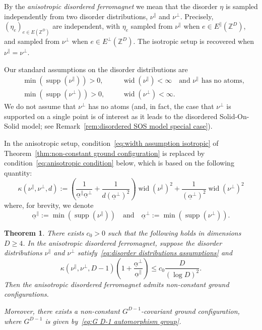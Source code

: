 \documentclass[11pt, reqno]{amsart}
\newtheorem{theorem}{Theorem}[section]
\newcommand{\Z}{\mathbb{Z}}
\DeclareMathOperator{\supp}{supp}
\DeclareMathOperator{\wid}{wid}
\numberwithin{equation}{section}
\begin{document}
By the \emph{anisotropic disordered ferromagnet} we mean that the disorder $\eta$ is sampled independently from two disorder distributions, $\nu^{\parallel}$ and $\nu^{\perp}$. Precisely, $(\eta_e)_{e\in E(\Z^D)}$ are independent, with $\eta_e$ sampled from $\nu^{\parallel}$ when $e\in E^{\parallel}(\Z^D)$, and sampled from $\nu^{\perp}$ when $e\in E^{\perp}(\Z^D)$. The isotropic setup is recovered when $\nu^\parallel=\nu^\perp$.

Our standard assumptions on the disorder distributions are
\begin{equation}\label{eq:disorder distributions assumptions}
\begin{alignedat}{2}
&\min(\supp(\nu^\parallel))>0,\quad&&\wid(\nu^\parallel)<\infty\quad\text{and $\nu^\parallel$ has no atoms},\\
&\min(\supp(\nu^\perp))>0,&&\wid(\nu^\perp)<\infty.
\end{alignedat}
\end{equation}
We do not assume that $\nu^\perp$ has no atoms (and, in fact, the case that $\nu^\perp$ is supported on a single point is of interest as it leads to the disordered Solid-On-Solid model; see Remark~\ref{rem:disordered SOS model special case}).

In the anisotropic setup, condition~\eqref{eq:width assumption isotropic} of Theorem~\ref{thm:non-constant ground configuration} is replaced by condition~\eqref{eq:anisotropic condition} below, which is based on the following quantity:
\begin{equation}\label{eq:kappa_definition}
\kappa(\nu^\parallel, \nu^\perp,d) := \left( \frac{1}{\underline{\alpha}^{\parallel}\underline{\alpha}^{\perp}} +\frac{1}{d (\underline{\alpha}^{\perp})^2}\right)\wid (\nu^{\parallel})^{2}+\frac{1}{(\underline{\alpha}^{\perp})^2}\wid(\nu^{\perp})^{2}
\end{equation}
where, for brevity, we denote
\begin{equation}
\label{eq:alphas}    \underline{\alpha}^{\parallel}:=\min(\supp(\nu^\parallel))\quad\text{and}\quad\underline{\alpha}^{\perp}:=\min(\supp(\nu^\perp)).
\end{equation}

\begin{theorem}\label{thm:anisotropic non-constant ground configuration}
There exists $c_0>0$ such that the following holds in dimensions $D\ge 4$. In the anisotropic disordered ferromagnet, suppose the disorder distributions $\nu^\parallel$ and $\nu^\perp$ satisfy~\eqref{eq:disorder distributions assumptions} and
\begin{equation}\label{eq:anisotropic condition}
\kappa(\nu^\parallel, \nu^\perp,D-1) \left(1+\frac{\underline{\alpha}^{\perp}}{\underline{\alpha}^{\parallel}} \right)\le c_0\frac{D}{(\log D)^2}.
\end{equation}
Then the anisotropic disordered ferromagnet admits non-constant ground configurations.

\noindent Moreover, there exists a non-constant $G^{D-1}$-covariant ground configuration, where $G^{D-1}$ is given by~\eqref{eq:G D-1 automorphism group}.
\end{theorem}
\end{document}
